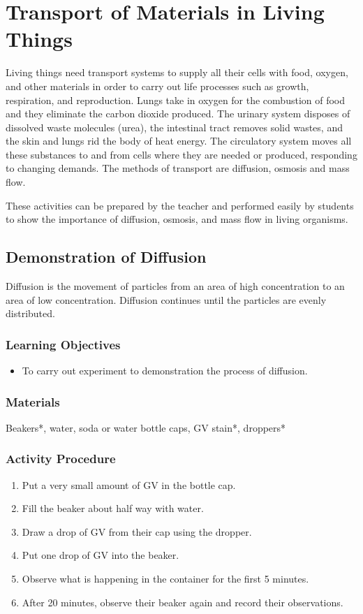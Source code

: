 \section{Transport of Materials in Living Things}
Living things need transport systems to supply all their cells with food, oxygen, and other materials in order to carry out life processes such as growth, respiration, and reproduction. Lungs take in oxygen for the combustion of food and they eliminate the carbon dioxide produced. The urinary system disposes of dissolved waste molecules (urea), the intestinal tract removes solid wastes, and the skin and lungs rid the body of heat energy. The circulatory system moves all these substances to and from cells where they are needed or produced, responding to changing demands. The methods of transport are diffusion, osmosis and mass flow.

These activities can be prepared by the teacher and performed easily by students to show the importance of diffusion, osmosis, and mass flow in living organisms.  

\subsection{Demonstration of Diffusion}

Diffusion is the movement of particles from an area of high concentration to an area of low concentration. Diffusion continues until the particles are evenly distributed.

\subsubsection*{Learning Objectives}
\begin{itemize}
\item{To carry out experiment to demonstration the process of diffusion.}
\end{itemize}

\subsubsection*{Materials}
Beakers*, water, soda or water bottle caps, GV stain*, droppers*

\subsubsection*{Activity Procedure}
\begin{enumerate}
\item{Put a very small amount of GV in the bottle cap.}
\item{Fill the beaker about half way with water.}
\item{Draw a drop of GV from their cap using the dropper.}
\item{Put one drop of GV into the beaker.}
\item{Observe what is happening in the container for the first 5 minutes.}
\item{After 20 minutes, observe their beaker again and record their observations.}
\end{enumerate}

